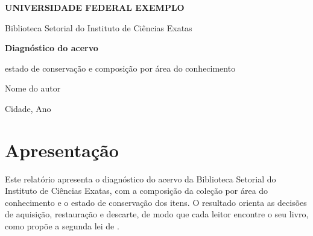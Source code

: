 \documentclass[11pt,a4paper]{report}
\newif\ifinstrucoes
\newcommand{\instrucao}[1]{\ifinstrucoes{\color{gray}\small\itshape #1\par}\fi}
\newcommand{\universidade}{Universidade Federal Exemplo}
\newcommand{\unidade}{Biblioteca Setorial do Instituto de Ciências Exatas}
\newcommand{\titulo}{Diagnóstico do acervo}
\newcommand{\subtitulo}{estado de conservação e composição por área do conhecimento}
\newcommand{\autores}{Nome do autor}
\newcommand{\local}{Cidade}
\newcommand{\data}{Ano}
\begin{document}
\begin{titlepage}
  \color{white}
  {\large\bfseries\MakeUppercase{\universidade}\par}
  {\unidade\par}
  \vspace{2.2cm}
  {\fontsize{30}{34}\selectfont\bfseries\titulo\par}
  \vspace{0.4em}
  {\Large\subtitulo\par}
  \color{black}
  \vspace{3cm}
  \begin{center}
  \end{center}
  \vfill
  {\large\autores\par}
  \vspace{1em}
  {\local, \data\par}
\end{titlepage}

\tableofcontents
\clearpage

\section{Apresentação}
\instrucao{Diga em um parágrafo qual biblioteca foi avaliada, quem pediu o diagnóstico e para que ele vai servir. Exemplo: subsidiar a política de desenvolvimento de coleções.}

Este relatório apresenta o diagnóstico do acervo da \unidade, com a composição da coleção por área do conhecimento e o estado de conservação dos itens. O resultado orienta as decisões de aquisição, restauração e descarte, de modo que cada leitor encontre o seu livro, como propõe a segunda lei de .
\end{document}
